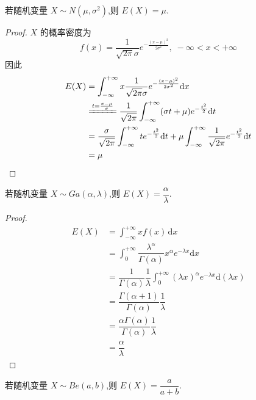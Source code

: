 \begin{conclusion}
    \indent 若随机变量 $X \sim N(\mu,\sigma^2)$,则 $E(X) = \mu$.
\end{conclusion}

\begin{proof}
    $X$ 的概率密度为
    $$
    f(x) = \dfrac{1}{\sqrt{2 \pi} \sigma} e^{-\frac{(x-\mu)^2}{2 \sigma^2}}, \; -\infty < x < +\infty
    $$
    因此
    $$
    \begin{aligned}
        E(X) &= \int_{-\infty}^{+\infty} x \dfrac{1}{\sqrt{2 \pi} \sigma} e^{-\frac{(x-\mu)^2}{2 \sigma^2}} \text{d}x \\
        & \xlongequal{t = \frac{x-\mu}{\sigma}} \dfrac{1}{\sqrt{2 \pi}} \int_{-\infty}^{+\infty} (\sigma t + \mu) e^{-\frac{t^2}{2}} \text{d}t \\
        &= \dfrac{\sigma}{\sqrt{2 \pi}} \int_{-\infty}^{+\infty} te^{-\frac{t^2}{2}} \text{d}t + \mu \int_{-\infty}^{+\infty} \dfrac{1}{\sqrt{2 \pi}} e^{-\frac{t^2}{2}} \text{d}t \\
        &= \mu
    \end{aligned}
    $$
\end{proof}

\begin{conclusion}
    \indent 若随机变量 $X \sim Ga(\alpha,\lambda)$,则 $E(X) = \dfrac{\alpha}{\lambda}$.
\end{conclusion}

\begin{proof}
    $$
    \begin{aligned}
        E(X) &= \int_{-\infty}^{+\infty} x f(x) \, \text{d}x \\
        &= \int_{0}^{+\infty} \dfrac{\lambda^\alpha}{\Gamma(\alpha)} x^\alpha e^{-\lambda x} \text{d}x \\
        &= \dfrac{1}{\Gamma(\alpha)} \dfrac{1}{\lambda} \int_{0}^{+\infty} (\lambda x)^\alpha e^{-\lambda x} \text{d}(\lambda x) \\
        &= \dfrac{\Gamma(\alpha + 1)}{\Gamma(\alpha)} \dfrac{1}{\lambda} \\
        &= \dfrac{\alpha \Gamma(\alpha)}{\Gamma(\alpha)} \dfrac{1}{\lambda} \\
        &= \dfrac{\alpha}{\lambda}
    \end{aligned}
    $$
\end{proof}

\begin{conclusion}
    \indent 若随机变量 $X \sim Be(a,b)$,则 $E(X) = \dfrac{a}{a+b}$.
\end{conclusion}

